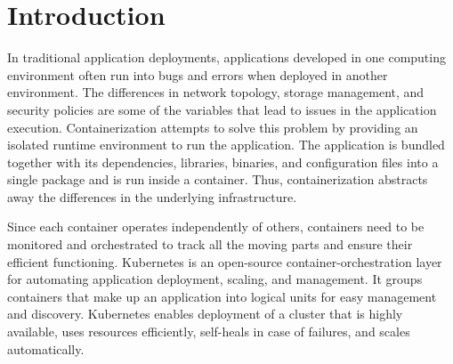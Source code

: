\documentclass[sigconf]{acmart}
\begin{document}



\maketitle

\section{Introduction}
In traditional application deployments, applications developed in one computing environment often run into bugs and errors when deployed in another environment. The differences in network topology, storage management, and security policies are some of the variables that lead to issues in the application execution. Containerization attempts to solve this problem by providing an isolated runtime environment to run the application. The application is  bundled together with its dependencies, libraries, binaries, and configuration files into a single package and is run inside a container. Thus, containerization abstracts away the differences in the underlying infrastructure.

Since each container operates independently of others, containers need to be monitored and orchestrated to track all the moving parts and ensure their efficient functioning. Kubernetes is an open-source container-orchestration layer for automating application deployment, scaling, and management.\cite{hightower2017kubernetes} It groups containers that make up an application into logical units for easy management and discovery. Kubernetes enables deployment of a cluster that is highly available, uses resources efficiently, self-heals in case of failures, and scales automatically.
\end{document}

